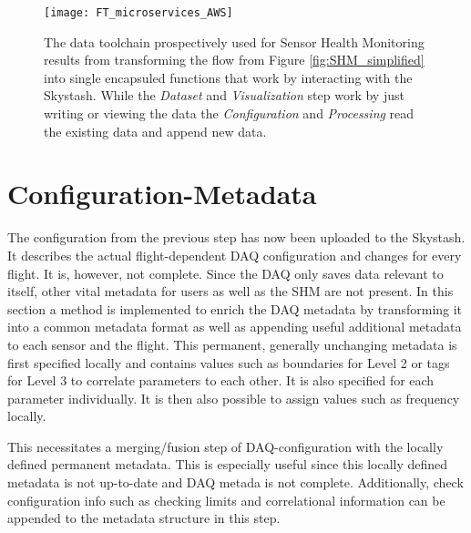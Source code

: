 \begin{figure}[h]
    \centering
    \texttt{[image: FT\_microservices\_AWS]}
    \caption[SHM representation as microservices]{The data toolchain prospectively used for Sensor Health Monitoring results from transforming the flow from Figure \ref{fig:SHM_simplified} into single encapsuled functions that work by interacting with the Skystash. While the \textit{Dataset} and \textit{Visualization} step work by just writing or viewing the data the \textit{Configuration} and \textit{Processing} read the existing data and append new data.}
    \label{fig:fti_microservices}
\end{figure}


\section{Configuration-Metadata}

The configuration from the previous step has now been uploaded to the Skystash. It describes the actual flight-dependent DAQ configuration and changes for every flight. It is, however, not complete. Since the DAQ only saves data relevant to itself, other vital metadata for users as well as the SHM are not present. In this section a method is implemented to enrich the DAQ metadata by transforming it into a common metadata format as well as appending useful additional metadata to each sensor and the flight.
This permanent, generally unchanging metadata is first specified locally and contains values such as boundaries for Level 2 or tags for Level 3 to correlate parameters to each other. It is also specified for each parameter individually. It is then also possible to assign values such as frequency locally.

This necessitates a merging/fusion step of DAQ-configuration with the locally defined permanent metadata. This is especially useful since this locally defined metadata is not up-to-date and DAQ metada is not complete. Additionally, check configuration info such as checking limits and correlational information can be appended to the metadata structure in this step.

